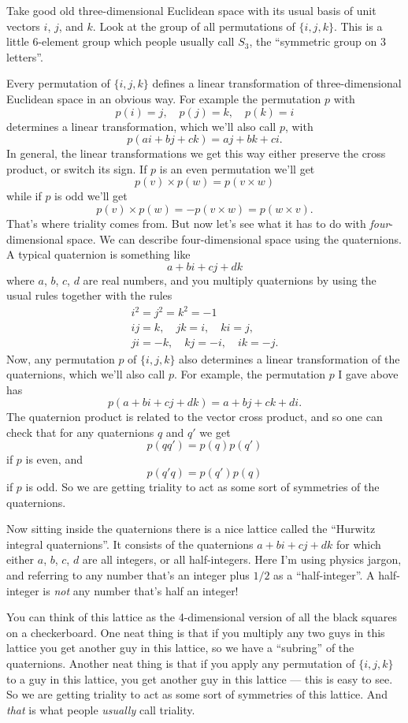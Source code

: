 \documentclass{article}
\begin{document}
Take good old three-dimensional Euclidean space with its usual basis of
unit vectors \(i\), \(j\), and \(k\). Look at the group of all
permutations of \(\{i,j,k\}\). This is a little 6-element group which
people usually call \(S_3\), the ``symmetric group on 3 letters''.

Every permutation of \(\{i,j,k\}\) defines a linear transformation of
three-dimensional Euclidean space in an obvious way. For example the
permutation \(p\) with \[p(i) = j, \quad p(j) = k, \quad p(k) = i\]
determines a linear transformation, which we'll also call \(p\), with
\[p(ai+ bj + ck) = aj + bk + ci.\] In general, the linear
transformations we get this way either preserve the cross product, or
switch its sign. If \(p\) is an even permutation we'll get
\[p(v)\times p(w) = p(v\times w)\] while if \(p\) is odd we'll get
\[p(v)\times p(w) = -p(v\times w) = p(w\times v).\] That's where
triality comes from. But now let's see what it has to do with
\emph{four}-dimensional space. We can describe four-dimensional space
using the quaternions. A typical quaternion is something like
\[a + bi + cj + dk\] where \(a\), \(b\), \(c\), \(d\) are real numbers,
and you multiply quaternions by using the usual rules together with the
rules \[
  \begin{gathered}
    i^2 = j^2 = k^2 = -1
  \\ij=k,\quad jk=i,\quad ki=j,
  \\ji=-k,\quad kj=-i,\quad ik=-j.
  \end{gathered}
\] Now, any permutation \(p\) of \(\{i,j,k\}\) also determines a linear
transformation of the quaternions, which we'll also call \(p\). For
example, the permutation \(p\) I gave above has
\[p(a + bi + cj + dk) = a + bj + ck + di.\] The quaternion product is
related to the vector cross product, and so one can check that for any
quaternions \(q\) and \(q'\) we get \[p(qq') = p(q)p(q')\] if \(p\) is
even, and \[p(q'q) = p(q')p(q)\] if \(p\) is odd. So we are getting
triality to act as some sort of symmetries of the quaternions.

Now sitting inside the quaternions there is a nice lattice called the
``Hurwitz integral quaternions''. It consists of the quaternions
\(a + bi + cj + dk\) for which either \(a\), \(b\), \(c\), \(d\) are all
integers, or all half-integers. Here I'm using physics jargon, and
referring to any number that's an integer plus \(1/2\) as a
``half-integer''. A half-integer is \emph{not} any number that's half an
integer!

You can think of this lattice as the 4-dimensional version of all the
black squares on a checkerboard. One neat thing is that if you multiply
any two guys in this lattice you get another guy in this lattice, so we
have a ``subring'' of the quaternions. Another neat thing is that if you
apply any permutation of \(\{i,j,k\}\) to a guy in this lattice, you get
another guy in this lattice --- this is easy to see. So we are getting
triality to act as some sort of symmetries of this lattice. And
\emph{that} is what people \emph{usually} call triality.
\end{document}
